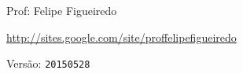 \documentclass[a4paper]{article}
\begin{document}
\parbox[c]{.825\textwidth}{\raggedright%
{Prof: Felipe Figueiredo\par}
{\url{http://sites.google.com/site/proffelipefigueiredo}\par}
}

Versão: \verb|20150528|



\section{}
\end{document}
